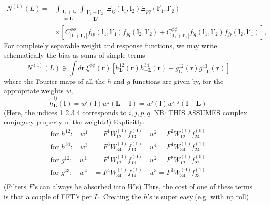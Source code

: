 \documentclass[11pt]{article}
\begin{document}
\newcommand{\bl}{\boldsymbol{l}}
\newcommand{\br}{\boldsymbol{r}}
\newcommand{\hn}[0]{{\hat n}}

\newcommand{\bll}{\boldsymbol{L}}
\newcommand{\intL}{\int_{\substack{\bl_1 + \bl_2 \\ =\bll }}}
\newcommand{\intLp}{\int_{\substack{\bl'_1 + \bl'_2 \\ =\bll' }}}

\newcommand{\cred}[1]{\color{red} {#1} \color{black}}
\begin{equation}
\begin{split}
N^{(1)}(L) = &\intL \intLp \Xi_{ij}(\bl_1, \bl_2) \Xi_{pq}(\bl'_1, \bl'_2) \\ &\times\left[ C^{\phi \phi}_{|\bl_1+\bl'_1|}f_{ip}(\bl_1, \bl'_1) f_{jq}(\bl_2, \bl'_2) + C^{\phi \phi}_{|\bl_1+\bl'_2|}f_{iq}(\bl_1, \bl'_2) f_{jp}(\bl_2, \bl'_1) \right] ,
\end{split}
\end{equation}
For completely separable weight and response functions, we may write schematically the bias as sums of simple terms   \color{black}
\begin{equation}
	N^{(1)}(L) \ni  \int d\br\: \xi^{\phi \phi}(\br)\left[ h^{12}_{\bll}(\br) h^{34}_{-\bll}(\br) + g^{12}_{\bll}(\br) g^{43}_{-\bll}(\br)\right ]
\end{equation}
where the Fourier maps of all the $h$ and $g$ functions are given by, for the appropriate weights $w$,
\begin{equation}
	\tilde h^{ij}_{\bll}(\bl) =  w^i(\bl) w^j(\bll - \bl) = w^i(\bl) w^{\star, j}(\bl - \bll)
\end{equation}
(Here, the indices 1 2 3 4 corresponds to $i,j,p,q$. NB: THIS ASSUMES complex conjugacy property of the weights!)
Explicitly:
\begin{equation}
\begin{split}
\textrm{for }h^{12}:\quad w^1 &= F^1 W_{12}^{(0)} f^{(0)}_{13}	\quad w^2 = F^2W_{12}^{(1)}f^{(0)}_{24} \\
\textrm{for }h^{34}:\quad w^3 &= F^3 W_{34}^{(0)} f^{(1)}_{13}	\quad w^4 = F^4W_{34}^{(1)}f^{(1)}_{24} \\
\textrm{for }g^{12}:\quad w^1 &= F^1 W_{12}^{(0)} f^{(0)}_{14}	\quad w^2 = F^2W_{12}^{(1)}f^{(0)}_{23} \\
\textrm{for }g^{43}:\quad w^4 &= F^4 W_{34}^{(1)} f^{(1)}_{14}	\quad w^3 = F^3W_{34}^{(0)}f^{(1)}_{23} \\
\end{split}
\end{equation}
(Filters $F$'s can always be absorbed into $W$'s)
Thus, the cost of one of these terms is that a couple of FFT's per $L$. Creating the $h$'s is super easy (e.g. with np roll)
\end{document}
